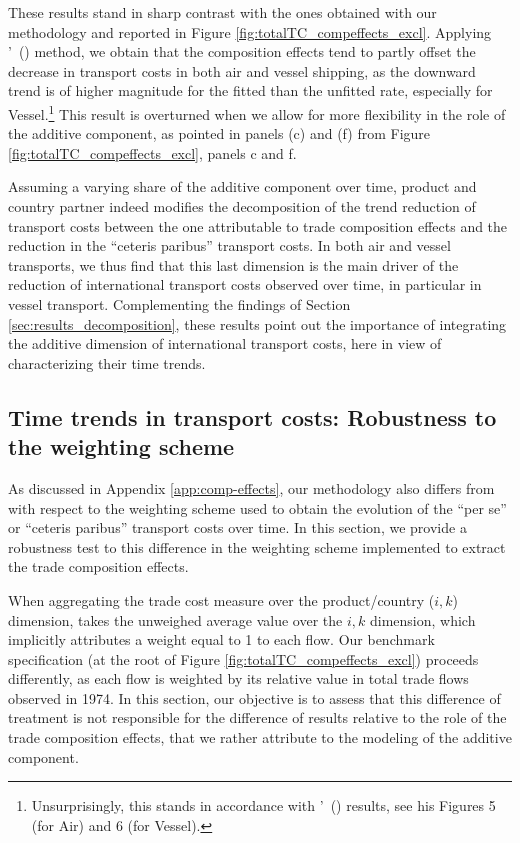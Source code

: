 \documentclass[a4paper,11pt]{article}
\newcommand\citeh[1]{\citeauthor{#1}'\ (\citeyear{#1})}
\begin{document}
\begin{figure}[htbp]
\begin{center}
\begin{tabular}{cc}
\end{tabular}
\end{center}
\end{figure}

These results stand in sharp contrast with the ones obtained with our methodology and reported in Figure \ref{fig:totalTC_compeffects_excl}. Applying \citeh{hummels2007} method, we obtain that the composition effects tend to partly offset the decrease in transport costs in both air and vessel shipping, as the downward trend is of higher magnitude for the fitted than the unfitted rate, especially for Vessel.\footnote{Unsurprisingly, this stands in accordance with \citeh{hummels2007} results, see his Figures 5 (for Air) and 6 (for Vessel).} This result is overturned when we allow for more flexibility in the role of the additive component, as pointed in panels (c) and (f) from Figure \ref{fig:totalTC_compeffects_excl}, panels c and f.

Assuming a varying share of the additive component over time, product and country partner indeed modifies the decomposition of the trend reduction of transport costs between the one attributable to trade composition effects and the reduction in the ``ceteris paribus'' transport costs. In both air and vessel transports, we thus find that this last dimension is the main driver of the reduction of international transport costs observed over time, in particular in vessel transport. Complementing the findings of Section \ref{sec:results_decomposition}, these results point out the importance of integrating the additive dimension of international transport costs, here in view of characterizing their time trends.

\subsection{Time trends in transport costs: Robustness to the weighting scheme \label{sec:robustness}}

As discussed in Appendix \ref{app:comp-effects}, our methodology also differs from \citet{hummels2007} with respect to the weighting scheme used to obtain the evolution of the ``per se'' or ``ceteris paribus'' transport costs over time. In this section, we provide a robustness test to this difference in the weighting scheme implemented to extract the trade composition effects.\smallskip

When aggregating the trade cost measure over the product/country ($i,k$) dimension, \cite{hummels2007} takes the unweighed average value over the $i,k$ dimension, which implicitly attributes a weight equal to 1 to each flow. Our benchmark specification  (at the root of Figure \ref{fig:totalTC_compeffects_excl}) proceeds differently, as each flow is weighted by its relative value in total trade flows observed in 1974. In this section, our objective is to assess that this difference of treatment is not responsible for the difference of results relative to the role of the trade composition effects, that we rather attribute to the modeling of the additive component.
\end{document}
